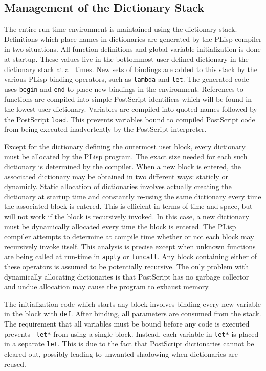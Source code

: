 \subsection {Management of the Dictionary Stack}
The entire run-time environment is maintained using the dictionary
stack.  Definitions which place names in dictionaries are generated 
by the PLisp compiler in two situations.  All function definitions and global
variable initialization is done at startup.  These values live
in the bottommost user defined dictionary in the dictionary stack at
all times.  New sets of bindings are added to this stack by the
various PLisp binding operators, such as {\tt lambda} and {\tt let}.
The generated code uses {\tt begin} and {\tt end} to place new
bindings in the environment.  References to functions are compiled
into simple PostScript identifiers which will be found in the lowest
user dictionary.  Variables are compiled into quoted names followed by
the PostScript {\tt load}.  This prevents variables bound to compiled
PostScript code from being executed inadvertently by the PostScript
interpreter.

Except for the dictionary defining the outermost user block, every
dictionary must be allocated by the PLisp program.  The exact size
needed for each such dictionary is determined by the compiler.  When a
new block is entered, the associated dictionary may be obtained in
two different ways: staticly or dynamicly.  Static allocation of
dictionaries involves actually creating the dictionary at
startup time and constantly re-using the same dictionary every
time the associated block is entered.  This is efficient in terms of
time and space, but will not work if the block is recursively invoked.
In this case, a new dictionary must be dynamically allocated every
time the block is entered.  The PLisp compiler attempts to determine
at compile time whether or not each block may recursively invoke
itself.  This analysis is precise except when unknown functions are being
called at run-time in {\tt apply} or {\tt funcall}.  Any block
containing either of these operators is assumed to be potentially
recursive.  The only problem with dynamically allocating dictionaries
is that PostScript has no garbage collector and undue allocation may
cause the program to exhaust memory.

The initialization code which starts any block involves binding every
new variable in the block with {\tt def}.  After binding, all
parameters are consumed from the stack.  The requirement that all
variables must be bound before any code is executed prevents {\tt
let*} from using a single block.  Instead, each variable in {\tt let*}
is placed in a separate {\tt let}.  This is due to the fact that
PostScript dictionaries cannot be cleared out, possibly leading to
unwanted shadowing when dictionaries are reused.

